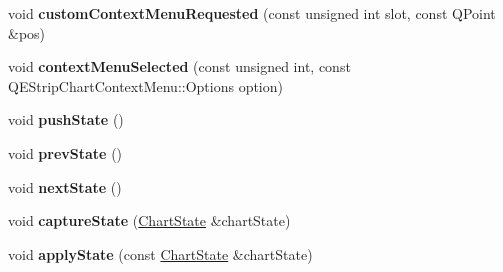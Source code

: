 \begin{DoxyCompactItemize}
\item 
\hypertarget{classQEStripChart_1_1PrivateData_abb755eb9844c4052b3cec775dba19d6e}{
void {\bfseries customContextMenuRequested} (const unsigned int slot, const QPoint \&pos)}
\label{classQEStripChart_1_1PrivateData_abb755eb9844c4052b3cec775dba19d6e}

\item 
\hypertarget{classQEStripChart_1_1PrivateData_ae92f9bb8e96d5316ba1d39a194703023}{
void {\bfseries contextMenuSelected} (const unsigned int, const QEStripChartContextMenu::Options option)}
\label{classQEStripChart_1_1PrivateData_ae92f9bb8e96d5316ba1d39a194703023}

\item 
\hypertarget{classQEStripChart_1_1PrivateData_aef7ad929615a8a2cd87c64e2e02bbea6}{
void {\bfseries pushState} ()}
\label{classQEStripChart_1_1PrivateData_aef7ad929615a8a2cd87c64e2e02bbea6}

\item 
\hypertarget{classQEStripChart_1_1PrivateData_afa6b3b190e280f0f3db8340f18bb9196}{
void {\bfseries prevState} ()}
\label{classQEStripChart_1_1PrivateData_afa6b3b190e280f0f3db8340f18bb9196}

\item 
\hypertarget{classQEStripChart_1_1PrivateData_a3a204229c697c2da0379b43d8cce69db}{
void {\bfseries nextState} ()}
\label{classQEStripChart_1_1PrivateData_a3a204229c697c2da0379b43d8cce69db}

\item 
\hypertarget{classQEStripChart_1_1PrivateData_a88f9eec770f0c64d6136ae61d028df15}{
void {\bfseries captureState} (\hyperlink{classChartState}{ChartState} \&chartState)}
\label{classQEStripChart_1_1PrivateData_a88f9eec770f0c64d6136ae61d028df15}

\item 
\hypertarget{classQEStripChart_1_1PrivateData_a145603cf1526a552c498b8e06d5c1bbc}{
void {\bfseries applyState} (const \hyperlink{classChartState}{ChartState} \&chartState)}
\label{classQEStripChart_1_1PrivateData_a145603cf1526a552c498b8e06d5c1bbc}

\end{DoxyCompactItemize}
